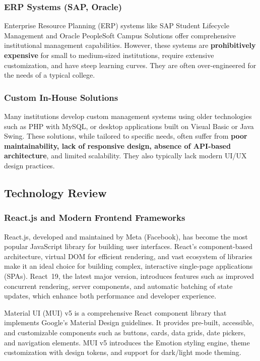 \subsubsection{ERP Systems (SAP, Oracle)}
Enterprise Resource Planning (ERP) systems like SAP Student Lifecycle Management and Oracle PeopleSoft Campus Solutions offer comprehensive institutional management capabilities. However, these systems are \textbf{prohibitively expensive} for small to medium-sized institutions, require extensive customization, and have steep learning curves. They are often over-engineered for the needs of a typical college.

\subsubsection{Custom In-House Solutions}
Many institutions develop custom management systems using older technologies such as PHP with MySQL, or desktop applications built on Visual Basic or Java Swing. These solutions, while tailored to specific needs, often suffer from \textbf{poor maintainability, lack of responsive design, absence of API-based architecture}, and limited scalability. They also typically lack modern UI/UX design practices.

\subsection{Technology Review}

\subsubsection{React.js and Modern Frontend Frameworks}
React.js, developed and maintained by Meta (Facebook), has become the most popular JavaScript library for building user interfaces. React's component-based architecture, virtual DOM for efficient rendering, and vast ecosystem of libraries make it an ideal choice for building complex, interactive single-page applications (SPAs). React~19, the latest major version, introduces features such as improved concurrent rendering, server components, and automatic batching of state updates, which enhance both performance and developer experience.

Material UI (MUI) v5 is a comprehensive React component library that implements Google's Material Design guidelines. It provides pre-built, accessible, and customizable components such as buttons, cards, data grids, date pickers, and navigation elements. MUI v5 introduces the Emotion styling engine, theme customization with design tokens, and support for dark/light mode theming.

